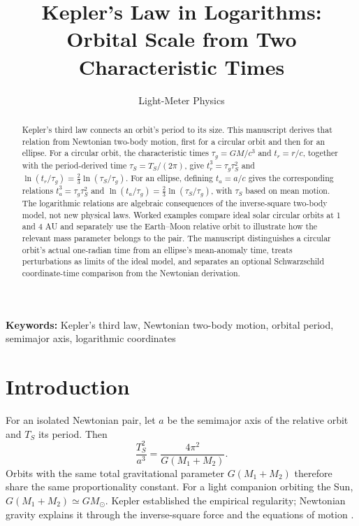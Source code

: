 \documentclass[12pt]{article}
\title{Kepler's Law in Logarithms:\\
Orbital Scale from Two Characteristic Times}
\author{Light-Meter Physics}
\date{}
\begin{document}
\maketitle

\begin{abstract}
Kepler's third law connects an orbit's period to its size. This manuscript derives that relation from Newtonian two-body motion, first for a circular orbit and then for an ellipse. For a circular orbit, the characteristic times $\tau_g=GM/c^3$ and $t_r=r/c$, together with the period-derived time $\tau_S=T_S/(2\pi)$, give $t_r^3=\tau_g\tau_S^2$ and $\ln(t_r/\tau_g)=\frac{2}{3}\ln(\tau_S/\tau_g)$. For an ellipse, defining $t_a=a/c$ gives the corresponding relations $t_a^3=\tau_g\tau_S^2$ and $\ln(t_a/\tau_g)=\frac{2}{3}\ln(\tau_S/\tau_g)$, with $\tau_S$ based on mean motion. The logarithmic relations are algebraic consequences of the inverse-square two-body model, not new physical laws. Worked examples compare ideal solar circular orbits at 1 and 4 AU and separately use the Earth--Moon relative orbit to illustrate how the relevant mass parameter belongs to the pair. The manuscript distinguishes a circular orbit's actual one-radian time from an ellipse's mean-anomaly time, treats perturbations as limits of the ideal model, and separates an optional Schwarzschild coordinate-time comparison from the Newtonian derivation.
\end{abstract}

\noindent\textbf{Keywords:} Kepler's third law, Newtonian two-body motion, orbital period, semimajor axis, logarithmic coordinates

\section{Introduction}
\label{sec:introduction}

For an isolated Newtonian pair, let $a$ be the semimajor axis of the relative orbit and $T_S$ its period. Then
\begin{equation}
  \frac{T_S^2}{a^3}=\frac{4\pi^2}{G(M_1+M_2)}.
  \label{eq:third-law-pair}
\end{equation}
Orbits with the same total gravitational parameter $G(M_1+M_2)$ therefore share the same proportionality constant. For a light companion orbiting the Sun, $G(M_1+M_2)\simeq GM_\odot$. Kepler established the empirical regularity; Newtonian gravity explains it through the inverse-square force and the equations of motion \cite{KeplerHarmonices,NewtonPrincipia,OpenStaxKepler}.
\end{document}
